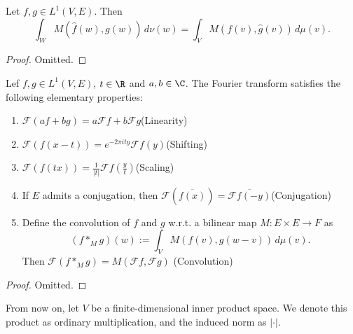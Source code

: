 \begin{lemma}
\label{lem:fourier-multiplication}
\leanok
Let $f,g\in L^1(V,E)$. Then
$$\int_WM(\widehat f(w),g(w))\,d\nu(w)=\int_VM(f(v),\widehat g(v))\,d\mu(v).$$
\end{lemma}
\begin{proof}
  \leanok
  Omitted.
\end{proof}

\begin{lemma}
  \label{lem:fourier-prop}
  \leanok
Lef $f,g\in L^1(V,E)$, $t\in\R$ and $a,b\in\C$. The Fourier transform satisfies the following elementary properties:
\begin{enumerate}
  \item[(i)] $\mathcal F(af+bg)=a\mathcal Ff+b\mathcal Fg$\hfill(Linearity)
  \item[(ii)] $\mathcal F(f(x-t)) = e^{-2\pi i ty}\mathcal F f(y)$\hfill (Shifting)
  \item[(iii)] $\mathcal F(f(tx)) = \frac1{|t|}\mathcal F f(\frac yt)$\hfill (Scaling)
  \item[(iv)] If $E$ admits a conjugation, then $\mathcal F(\overline{f(x)}) = \overline{\mathcal Ff(-y)}$\hfill (Conjugation)
  \item[(v)] Define the convolution of $f$ and $g$ w.r.t. a bilinear map $M:E\times E\to F$ as
             $$(f\ast_Mg)(w):=\int_VM(f(v),g(w-v))\,d\mu(v).$$ Then
             $\mathcal F(f\ast_M g) =M(\mathcal Ff,\mathcal Fg)$ \hfill (Convolution)
\end{enumerate}
\end{lemma}
\begin{proof}
  \leanok
  Omitted.
\end{proof}
From now on, let $V$ be a finite-dimensional inner product space.
We denote this product as ordinary multiplication, and the induced norm as $|\cdot|.$


